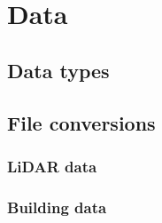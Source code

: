 \section{Data}

\subsection{Data types}


\subsection{File conversions}

\subsubsection{LiDAR data}


\subsubsection{Building data}

